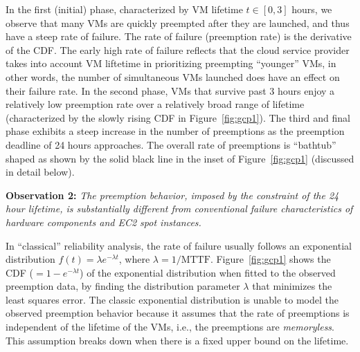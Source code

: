 \noindent In the first (initial) phase, characterized by VM lifetime $t\in [0, 3]$ hours, we observe that many VMs are quickly preempted after they are launched, and thus have a steep rate of failure. The rate of failure (preemption rate) is the derivative of the CDF.
The early high rate of failure reflects that the cloud service provider takes into account VM liftetime in prioritizing preempting ``younger'' VMs, in other words, the number of simultaneous VMs launched does have an effect on their failure rate. 
%
In the second phase, VMs that survive past 3 hours enjoy a relatively low preemption rate over a relatively broad range of lifetime (characterized by the slowly rising CDF in Figure~\ref{fig:gcp1}).
The third and final phase exhibits a steep increase in the number of preemptions as the preemption deadline of 24 hours approaches.
The overall rate of preemptions is ``bathtub'' shaped as shown by the solid black line in the inset of Figure~\ref{fig:gcp1} (discussed in detail below).



\noindent \textbf{Observation 2:} \emph{The preemption behavior, imposed by the constraint of the 24 hour lifetime, is substantially different from conventional failure characteristics of hardware components and EC2 spot instances.}

\noindent In ``classical'' reliability analysis, the rate of failure  usually follows an exponential distribution $f(t) = \lambda e^{-\lambda t}$, where $\lambda=1/\text{MTTF}$.
Figure~\ref{fig:gcp1} shows the CDF ($=1-e^{-\lambda t}$) of the exponential distribution when fitted to the observed preemption data, by finding the distribution parameter $\lambda$ that minimizes the least squares error.
The classic exponential distribution is unable to model the observed preemption behavior because it assumes that the rate of preemptions is independent of the lifetime of the VMs, i.e., the preemptions are \emph{memoryless}.
This assumption breaks down when there is a fixed upper bound on the lifetime. %

